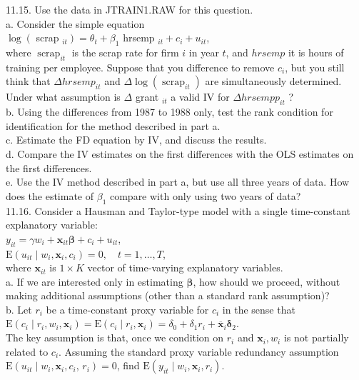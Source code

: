 \documentclass[10pt]{article}
\begin{document}
11.15. Use the data in JTRAIN1.RAW for this question.\\
a. Consider the simple equation\\
$\log \left(\right.$ scrap $\left._{i t}\right)=\theta_{t}+\beta_{1}$ hrsemp $_{i t}+c_{i}+u_{i t}$,\\
where $\operatorname{scrap}_{i t}$ is the scrap rate for firm $i$ in year $t$, and $h r s e m p$ it is hours of training per employee. Suppose that you difference to remove $c_{i}$, but you still think that $\Delta h r s e m p_{i t}$ and $\Delta \log \left(\operatorname{scrap}_{i t}\right)$ are simultaneously determined. Under what assumption is $\Delta$ grant $_{i t}$ a valid IV for $\Delta h r s e m p p_{i t}$ ?\\
b. Using the differences from 1987 to 1988 only, test the rank condition for identification for the method described in part a.\\
c. Estimate the FD equation by IV, and discuss the results.\\
d. Compare the IV estimates on the first differences with the OLS estimates on the first differences.\\
e. Use the IV method described in part a, but use all three years of data. How does the estimate of $\beta_{1}$ compare with only using two years of data?\\
11.16. Consider a Hausman and Taylor-type model with a single time-constant explanatory variable:\\
$y_{i t}=\gamma w_{i}+\mathbf{x}_{i t} \boldsymbol{\beta}+c_{i}+u_{i t}$,\\
$\mathrm{E}\left(u_{i t} \mid w_{i}, \mathbf{x}_{i}, c_{i}\right)=0, \quad t=1, \ldots, T$,\\
where $\mathbf{x}_{i t}$ is $1 \times K$ vector of time-varying explanatory variables.\\
a. If we are interested only in estimating $\boldsymbol{\beta}$, how should we proceed, without making additional assumptions (other than a standard rank assumption)?\\
b. Let $r_{i}$ be a time-constant proxy variable for $c_{i}$ in the sense that\\
$\mathrm{E}\left(c_{i} \mid r_{i}, w_{i}, \mathbf{x}_{i}\right)=\mathrm{E}\left(c_{i} \mid r_{i}, \mathbf{x}_{i}\right)=\delta_{0}+\delta_{1} r_{i}+\overline{\mathbf{x}}_{i} \boldsymbol{\delta}_{2}$.\\
The key assumption is that, once we condition on $r_{i}$ and $\mathbf{x}_{i}, w_{i}$ is not partially related to $c_{i}$. Assuming the standard proxy variable redundancy assumption $\mathrm{E}\left(u_{i t} \mid w_{i}, \mathbf{x}_{i}, c_{i}\right.$, $\left.r_{i}\right)=0$, find $\mathrm{E}\left(y_{i t} \mid w_{i}, \mathbf{x}_{i}, r_{i}\right)$.\\
\end{document}

